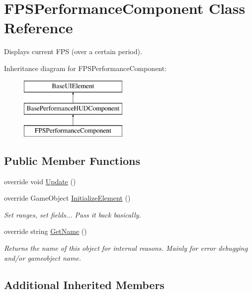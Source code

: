 \hypertarget{class_f_p_s_performance_component}{}\section{F\+P\+S\+Performance\+Component Class Reference}
\label{class_f_p_s_performance_component}


Displays current F\+PS (over a certain period).  


Inheritance diagram for F\+P\+S\+Performance\+Component\+:\begin{figure}[H]
\begin{center}
\leavevmode
\includegraphics[height=3.000000cm]{class_f_p_s_performance_component}
\end{center}
\end{figure}
\subsection*{Public Member Functions}
\begin{DoxyCompactItemize}
\item 
override void \hyperlink{class_f_p_s_performance_component_adf1034c8ddd444a0321d107159d85794}{Update} ()
\item 
override Game\+Object \hyperlink{class_f_p_s_performance_component_a3c6259f70c2121abed18aa5414833f68}{Initialize\+Element} ()
\begin{DoxyCompactList}\small\item\em Set ranges, set fields... Pass it back basically. \end{DoxyCompactList}\item 
override string \hyperlink{class_f_p_s_performance_component_a92f903f9764b4f62cda021f0e7f05db7}{Get\+Name} ()
\begin{DoxyCompactList}\small\item\em Returns the name of this object for internal reasons. Mainly for error debugging and/or gameobject name. \end{DoxyCompactList}\end{DoxyCompactItemize}
\subsection*{Additional Inherited Members}


